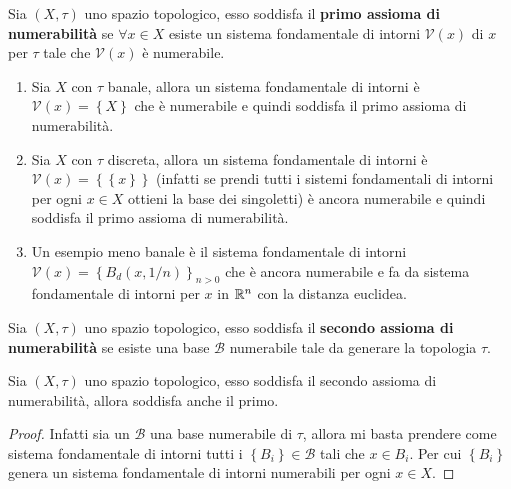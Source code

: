\begin{definition}
	Sia $(X,\tau)$ uno spazio topologico, esso soddisfa il \textbf{primo assioma di numerabilità} se $\forall x \in X$ esiste un sistema fondamentale di intorni $\mathcal{V}(x)$ di $x$ per $\tau$ tale che $\mathcal{V}(x)$ è numerabile.
\end{definition}

\begin{example}	
\begin{enumerate}
	\item Sia $X$ con $\tau$ banale, allora un sistema fondamentale di intorni è $\mathcal{V}(x) = \left\{X\right\}$ che è numerabile e quindi soddisfa il primo assioma di numerabilità.
	\item Sia $X$ con $\tau$ discreta, allora un sistema fondamentale di intorni è $\mathcal{V}(x) = \left\{\left\{x\right\}\right\}$ (infatti se prendi tutti i sistemi fondamentali di intorni per ogni $x\in X$ ottieni la base dei singoletti) è ancora numerabile e quindi soddisfa il primo assioma di numerabilità.
	\item Un esempio meno banale è il sistema fondamentale di intorni $\mathcal{V}(x) = \left\{B_d(x, 1/n)\right\}_{n > 0}$ che è ancora numerabile e fa da sistema fondamentale di intorni per $x$ in $\mathbb{R}^n$ con la distanza euclidea.
\end{enumerate}
\end{example}


\begin{definition}
	Sia $(X,\tau)$ uno spazio topologico, esso soddisfa il \textbf{secondo assioma di numerabilità} se esiste una base $\mathcal{B}$ numerabile tale da generare la topologia $\tau$. 
\end{definition}

\begin{lemma}
	Sia $(X,\tau)$ uno spazio topologico, esso soddisfa il secondo assioma di numerabilità, allora soddisfa anche il primo. 
\end{lemma}
\begin{proof}
	Infatti sia un $\mathcal{B}$ una base numerabile di $\tau$, allora mi basta prendere come sistema fondamentale di intorni tutti i $\left\{B_i\right\} \in \mathcal{B}$ tali che $x \in B_i$. Per cui $\left\{B_i\right\}$ genera un sistema fondamentale di intorni numerabili per ogni $x \in X$.
\end{proof}


